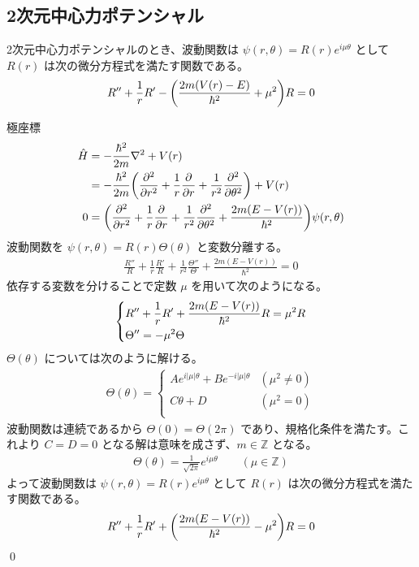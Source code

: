 \documentclass[uplatex,dvipdfmx,a4paper,11pt]{jlreq}
\makeatletter
\newcommand{\ZZ}{\mathbb{Z}}
\theoremstyle{definition}
\renewenvironment{proof}[1][\proofname]{\par
  \normalfont
  \topsep6\p@\@plus6\p@ \trivlist
  \item[\hskip\labelsep{\bfseries #1}\@addpunct{\bfseries}]\ignorespaces\quad\par
}{%
  \qed\endtrivlist\@endpefalse
}
\renewcommand\proofname{証明}
\makeatother
\begin{document}
\subsection{2次元中心力ポテンシャル}
\begin{proposition}
  2次元中心力ポテンシャルのとき、波動関数は $\psi(r, \theta) = R(r)e^{i\mu\theta}$ として $R(r)$ は次の微分方程式を満たす関数である。
  \begin{align}
    R'' + \frac{1}{r}R' - \qty(\frac{2m(V(r) - E)}{\hbar^2} + \mu^2)R = 0
  \end{align}
\end{proposition}
\begin{proof}
  極座標
  \begin{align}
    \hat{H} & = -\frac{\hbar^2}{2m}\laplacian + V(r)                                                                               \\
            & = -\frac{\hbar^2}{2m}\qty(\pdv[2]{r} + \frac{1}{r}\pdv{r} + \frac{1}{r^2}\pdv[2]{\theta}) + V(r)                     \\
    0       & = \qty(\pdv[2]{r} + \frac{1}{r}\pdv{r} + \frac{1}{r^2}\pdv[2]{\theta} + \frac{2m(E - V(r))}{\hbar^2})\psi(r, \theta)
  \end{align}
  波動関数を $\psi(r, \theta) = R(r)\Theta(\theta)$ と変数分離する。
  \begin{align}
    \frac{R''}{R} + \frac{1}{r}\frac{R'}{R} + \frac{1}{r^2}\frac{\Theta''}{\Theta} + \frac{2m(E - V(r))}{\hbar^2} = 0
  \end{align}
  依存する変数を分けることで定数 $\mu$ を用いて次のようになる。
  \begin{align}
    \begin{dcases}
      R'' + \frac{1}{r}R' + \frac{2m(E - V(r))}{\hbar^2}R = \mu^2R \\
      \Theta'' = -\mu^2\Theta
    \end{dcases}
  \end{align}
  $\Theta(\theta)$ については次のように解ける。
  \begin{align}
    \Theta(\theta) = \begin{cases}
                       Ae^{i|\mu|\theta} + Be^{-i|\mu|\theta} & (\mu^2 \neq 0) \\
                       C\theta + D                            & (\mu^2 = 0)    \\
                     \end{cases}
  \end{align}
  波動関数は連続であるから $\Theta(0) = \Theta(2\pi)$ であり、規格化条件を満たす。これより $C = D = 0$ となる解は意味を成さず、$m\in\ZZ$ となる。
  \begin{align}
    \Theta(\theta) = \frac{1}{\sqrt{2\pi}}e^{i\mu\theta} \qquad (\mu\in\ZZ)
  \end{align}
  よって波動関数は $\psi(r, \theta) = R(r)e^{i\mu\theta}$ として $R(r)$ は次の微分方程式を満たす関数である。
  \begin{align}
    R'' + \frac{1}{r}R' + \qty(\frac{2m(E - V(r))}{\hbar^2} - \mu^2)R = 0
  \end{align}
\end{proof}
\end{document}
